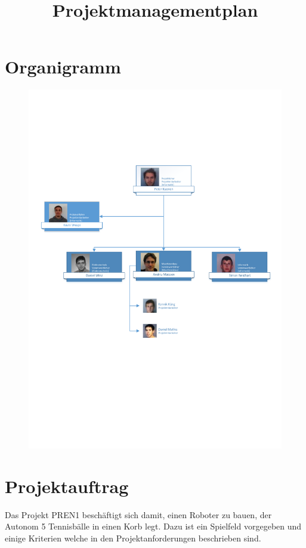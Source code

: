 \documentclass[a4paper,10pt,fleqn]{article}
\title{Projektmanagementplan}
\begin{document}

\clearpage
\tableofcontents
\clearpage

\newcommand{\tabheader}     %
{
    \begin{zebratabular}[l]{@{}p{0.2\linewidth}p{0.3\linewidth}p{0.3\linewidth}p{0.06\linewidth}@{}}
    \rowcolor{gray}
    Stichwort &
        Quelle &
        Beschreibung &
        Bew. \\
}

\section{Organigramm}
\begin{figure}[hb]
    \centering
    \includegraphics[width=4.5in]{pdf/organigramm.pdf}
\end{figure}

\section{Projektauftrag}
Das Projekt PREN1 beschäftigt sich damit, einen Roboter zu bauen, der Autonom 5 
Tennisbälle in einen Korb legt. Dazu ist ein Spielfeld vorgegeben und einige 
Kriterien welche in den Projektanforderungen beschrieben sind.
\end{document}
